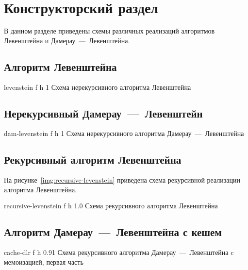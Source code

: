 \chapter{Конструкторский раздел}

В данном разделе приведены схемы различных реализаций алгоритмов Левенштейна и Дамерау~---~Левенштейна.

\section{Алгоритм Левенштейна}
{levenstein} %
{f} %
{h} %
{1 \textwidth} %
{Схема нерекурсивного алгоритма Левенштейна} %

\clearpage

\section{Нерекурсивный Дамерау~---~Левенштейн}
{dam-levenstein} %
{f} %
{h} %
{1 \textwidth} %
{Схема нерекурсивного алгоритма Дамерау~---~Левенштейна} %

\clearpage

\section{Рекурсивный алгоритм Левенштейна}

На рисунке~\ref{img:recursive-levenstein}
приведена схема рекурсивной реализации алгоритма Левенштейна.

{recursive-levenstein} %
{f} %
{h} %
{1.0\textwidth} %
{Схема рекурсивного алгоритма Левенштейна} %

\clearpage

\section{Алгоритм Дамерау~---~Левенштейна с кешем}

{cache-dlr} %
{f} %
{h} %
{0.91\textwidth} %
{Схема рекурсивного алгоритма Дамерау~---~Левенштейна c мемоизацией, первая часть} %

